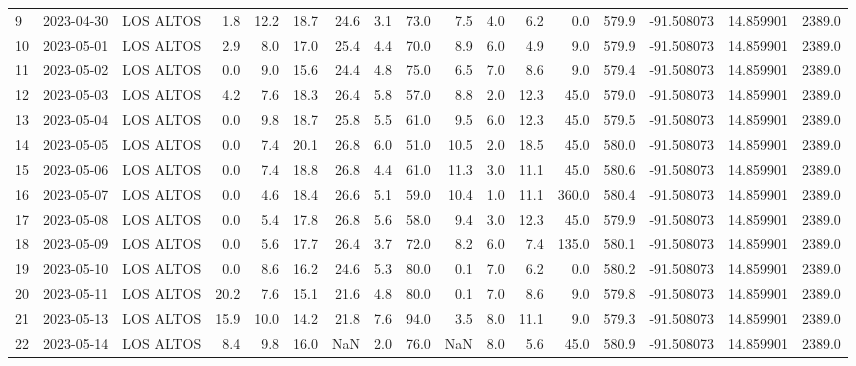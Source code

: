 \documentclass[12pt]{article}
\begin{document}
\begin{center}
\begin{tabular}{lllrrrrrrrrrrrrrr}
9   & 2023-04-30 &  LOS ALTOS &     1.8 &  12.2 &   18.7 &  24.6 &      3.1 &     73.0 &        7.5 &  4.0 &         6.2 &         0.0 &      579.9 & -91.508073 &  14.859901 &   2389.0 \\
10  & 2023-05-01 &  LOS ALTOS &     2.9 &   8.0 &   17.0 &  25.4 &      4.4 &     70.0 &        8.9 &  6.0 &         4.9 &         9.0 &      579.9 & -91.508073 &  14.859901 &   2389.0 \\
11  & 2023-05-02 &  LOS ALTOS &     0.0 &   9.0 &   15.6 &  24.4 &      4.8 &     75.0 &        6.5 &  7.0 &         8.6 &         9.0 &      579.4 & -91.508073 &  14.859901 &   2389.0 \\
12  & 2023-05-03 &  LOS ALTOS &     4.2 &   7.6 &   18.3 &  26.4 &      5.8 &     57.0 &        8.8 &  2.0 &        12.3 &        45.0 &      579.0 & -91.508073 &  14.859901 &   2389.0 \\
13  & 2023-05-04 &  LOS ALTOS &     0.0 &   9.8 &   18.7 &  25.8 &      5.5 &     61.0 &        9.5 &  6.0 &        12.3 &        45.0 &      579.5 & -91.508073 &  14.859901 &   2389.0 \\
14  & 2023-05-05 &  LOS ALTOS &     0.0 &   7.4 &   20.1 &  26.8 &      6.0 &     51.0 &       10.5 &  2.0 &        18.5 &        45.0 &      580.0 & -91.508073 &  14.859901 &   2389.0 \\
15  & 2023-05-06 &  LOS ALTOS &     0.0 &   7.4 &   18.8 &  26.8 &      4.4 &     61.0 &       11.3 &  3.0 &        11.1 &        45.0 &      580.6 & -91.508073 &  14.859901 &   2389.0 \\
16  & 2023-05-07 &  LOS ALTOS &     0.0 &   4.6 &   18.4 &  26.6 &      5.1 &     59.0 &       10.4 &  1.0 &        11.1 &       360.0 &      580.4 & -91.508073 &  14.859901 &   2389.0 \\
17  & 2023-05-08 &  LOS ALTOS &     0.0 &   5.4 &   17.8 &  26.8 &      5.6 &     58.0 &        9.4 &  3.0 &        12.3 &        45.0 &      579.9 & -91.508073 &  14.859901 &   2389.0 \\
18  & 2023-05-09 &  LOS ALTOS &     0.0 &   5.6 &   17.7 &  26.4 &      3.7 &     72.0 &        8.2 &  6.0 &         7.4 &       135.0 &      580.1 & -91.508073 &  14.859901 &   2389.0 \\
19  & 2023-05-10 &  LOS ALTOS &     0.0 &   8.6 &   16.2 &  24.6 &      5.3 &     80.0 &        0.1 &  7.0 &         6.2 &         0.0 &      580.2 & -91.508073 &  14.859901 &   2389.0 \\
20  & 2023-05-11 &  LOS ALTOS &    20.2 &   7.6 &   15.1 &  21.6 &      4.8 &     80.0 &        0.1 &  7.0 &         8.6 &         9.0 &      579.8 & -91.508073 &  14.859901 &   2389.0 \\
21  & 2023-05-13 &  LOS ALTOS &    15.9 &  10.0 &   14.2 &  21.8 &      7.6 &     94.0 &        3.5 &  8.0 &        11.1 &         9.0 &      579.3 & -91.508073 &  14.859901 &   2389.0 \\
22  & 2023-05-14 &  LOS ALTOS &     8.4 &   9.8 &   16.0 &   NaN &      2.0 &     76.0 &        NaN &  8.0 &         5.6 &        45.0 &      580.9 & -91.508073 &  14.859901 &   2389.0 \\
\bottomrule
\end{tabular}

        
        \end{center}
        
\end{document}
